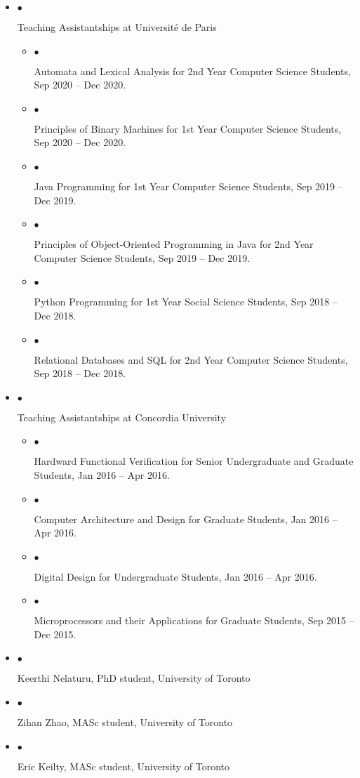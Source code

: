 \documentclass[10pt]{article}
\makeatletter
\newcommand{\lbar}[1]{{\color{#1}\ding{118}}\hspace*{2pt}}
\newenvironment{benumerate}[2]{
    \let\oldItem\item
    \def\item{\addtocounter{enumi}{-2}\oldItem}
    \begin{enumerate}[#2] \itemsep3pt
    \setcounter{enumi}{#1}
    \addtocounter{enumi}{1}}
  {\end{enumerate}}
\newcommand{\service}[1]{\item $\bullet$ \hspace{1ex}\parbox{7.2in}{#1}}
\newenvironment{publication}[5]
{ \item
  \begin{tabular*}{7.5in}{p{6.3in}@{\extracolsep{\fill}}r}
    \href{#1}{\textbf{#2}} & \textit{#3}\\ #4 &\\ \textit{#5}&\\
  \end{tabular*}
} {}
\newenvironment{region}[3]{%
  \vspace*{0.5ex}
  {\scalebox{1.4}{\textbf{#1}}}
  \begin{benumerate}{#3}{\color{RoyalBlue}#2}}
  {\end{benumerate}\vspace{0.8ex}}
\newenvironment{itemregion}[1]{
  \vspace*{0.5ex}
  {\scalebox{1.4}{\textbf{#1}}}
  \begin{itemize}\itemsep1pt}
  {\end{itemize}\vspace{0.8ex}}
\makeatother
\begin{document}
%
%

\begin{itemregion}{\lbar{red}Teaching}
  \service{Teaching Assistantships at Universit\'{e} de Paris}
  \begin{itemize}
    \service{Automata and Lexical Analysis for 2nd Year Computer Science Students, Sep 2020 -- Dec 2020.}
    \service{Principles of Binary Machines for 1st Year Computer Science Students, Sep 2020 -- Dec 2020.}
    \service{Java Programming for 1st Year Computer Science Students, Sep 2019 -- Dec 2019.}
    \service{Principles of Object-Oriented Programming in Java for 2nd Year Computer Science Students, Sep 2019 -- Dec 2019.}
    \service{Python Programming for 1st Year Social Science Students, Sep 2018 -- Dec 2018.}
    \service{Relational Databases and SQL for 2nd Year Computer Science Students, Sep 2018 -- Dec 2018.}
  \end{itemize}
  \service{Teaching Assistantships at Concordia University}
  \begin{itemize}
    \service{Hardward Functional Verification for Senior Undergraduate and Graduate Students, Jan 2016 -- Apr 2016.}
    \service{Computer Architecture and Design for Graduate Students, Jan 2016 -- Apr 2016.}
    \service{Digital Design for Undergraduate Students, Jan 2016 -- Apr 2016.}
    \service{Microprocessors and their Applications for Graduate Students, Sep 2015 -- Dec 2015.}
  \end{itemize}
\end{itemregion} 

\begin{itemregion}{\lbar{red}Mentoring}
  \service{Keerthi Nelaturu, PhD student, University of Toronto}
  \service{Zihan Zhao, MASc student, University of Toronto}
  \service{Eric Keilty, MASc student, University of Toronto}
\end{itemregion} 
\end{document}
